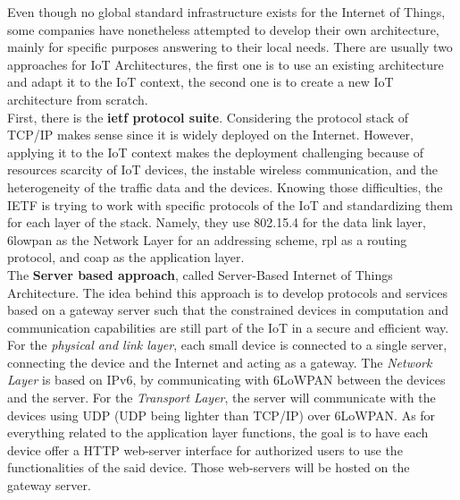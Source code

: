 Even though no global standard infrastructure exists for the Internet of Things, some companies have nonetheless attempted to develop their own architecture, mainly for specific purposes answering to their local needs. There are usually two approaches for IoT Architectures, the first one is to use an existing architecture and adapt it to the IoT context, the second one is to create a new IoT architecture from scratch.\\

First, there is the \textbf{\acrshort{ietf} protocol suite}. Considering the protocol stack of TCP/IP makes sense since it is widely deployed on the Internet. However, applying it to the IoT context makes the deployment challenging because of resources scarcity of IoT devices, the instable wireless communication, and the heterogeneity of the traffic data and the devices. Knowing those difficulties, the IETF is trying to work with specific protocols of the IoT and standardizing them  for each layer of the stack. Namely, they use 802.15.4 \cite{molisch2004ieee} for the data link layer, \acrfull{6lowpan} \cite{montenegro2007transmission} as the Network Layer for an addressing scheme, \acrfull{rpl} \cite{winter2012rpl} as a routing protocol, and \acrfull{coap} \cite{shelby2014constrained} as the application layer.\\

The \textbf{Server based approach}, called Server-Based Internet of Things Architecture. The idea behind this approach is to develop protocols and services based on a gateway server such that the constrained devices in computation and communication capabilities are still part of the IoT in a secure and efficient way. For the \textit{physical and link layer}, each small device is connected to a single server, connecting the device and the Internet and acting as a gateway. The \textit{Network Layer} is based on IPv6, by communicating with 6LoWPAN between the devices and the server. For the \textit{Transport Layer}, the server will communicate with the devices using UDP (UDP being lighter than TCP/IP) over 6LoWPAN. As for everything related to the application layer functions, the goal is to have each device offer a HTTP web-server interface for authorized users to use the functionalities of the said device. Those web-servers will be hosted on the gateway server.\\

